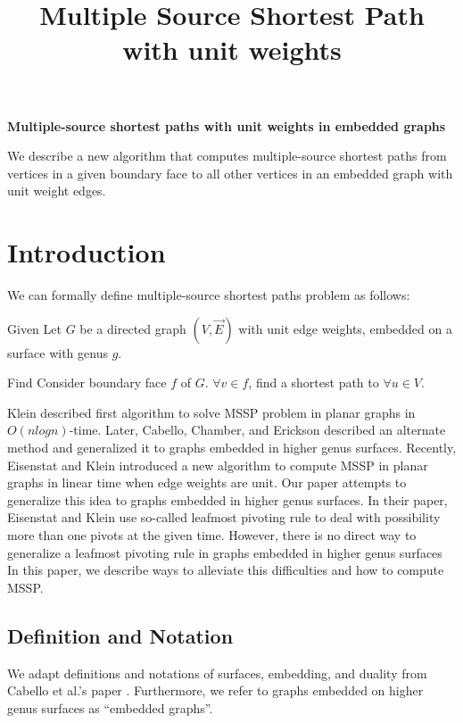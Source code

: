 \documentclass{article}
\begin{document}
\title{Multiple Source Shortest Path with unit weights}

\begin{center}
\textbf{\large Multiple-source shortest paths with unit weights in embedded
graphs}
\end{center}

\DRAFT

\begin{bigabstract}
We describe a new algorithm that computes multiple-source shortest paths from
vertices in a given boundary face to all other vertices in an embedded graph
with unit weight edges.
\end{bigabstract}

\section{Introduction}

We can formally define multiple-source shortest paths problem as follows: 

\begin{oneshot}{Given}
Let $G$ be a directed graph $(V, \vec{E})$ with unit edge weights, embedded on a surface with genus $g$.
\end{oneshot}

\begin{oneshot}{Find}
Consider boundary face $f$ of $G$. $\forall v \in f$, find a shortest path to
$\forall u \in V$.
\end{oneshot}

Klein \cite{klein2005multiple} described first algorithm to solve MSSP problem in planar graphs in $O(n logn)$-time. Later, Cabello, Chamber, and Erickson \cite{cabello2013multiple} described an alternate method and generalized it to graphs embedded in higher genus surfaces. 
Recently, Eisenstat and Klein \cite{eisenstat2013linear} introduced a new algorithm to compute MSSP in planar graphs in linear time when edge weights are unit. Our 
paper attempts to generalize this idea to graphs embedded in higher genus surfaces. In their paper, Eisenstat and Klein use so-called leafmost pivoting rule to deal with possibility more than one pivots at the given time. However, there is no direct way 
to generalize a leafmost pivoting rule in graphs embedded in higher genus surfaces 
In this paper, we describe ways to alleviate this difficulties and how to compute MSSP. 

\subsection{Definition and Notation}
We adapt definitions and notations of surfaces, embedding, and duality from Cabello et al.'s paper \cite{cabello2013multiple}. Furthermore, we refer to graphs embedded on higher genus surfaces as ``embedded graphs''.
\end{document}
